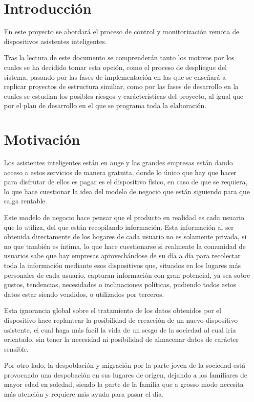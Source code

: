 \section{Introducción}

En este proyecto se abordará el proceso de control y monitorización remota de dispositivos asistentes inteligentes.

Tras la lectura de este documento se comprenderán tanto los motivos por los cuales se ha decidido tomar esta opción, como el proceso de despliegue del sistema, pasando por las fases de implementación en las que se enseñará a replicar proyectos de estructura similiar, como por las fases de desarrollo en la cuales se estudian los posibles riesgos y carácterísticas del proyecto, al igual que por el plan de desarrollo en el que se programa toda la elaboración.

\section{Motivación}

Los asistentes inteligentes están en auge y las grandes empresas están dando acceso a estos servicios de manera gratuita, donde lo único que hay que hacer para disfrutar de ellos es pagar es el dispositivo físico, en caso de que se requiera, lo que hace cuestionar la idea del modelo de negocio que están siguiendo para que salga rentable.

Este modelo de negocio hace pensar que el producto en realidad es cada usuario que lo utiliza, del que están recopilando información. Esta información al ser obtenida directamente de los hogares de cada usuario no es solamente privada, si no que también es íntima, lo que hace cuestionarse si realmente la comunidad de usuarios sabe que hay empresas aprovechándose de su día a día para recolectar toda la información mediante esos dispositivos que, situados en los lugares más personales de cada usuario, capturan información con gran potencial, ya sea sobre gustos, tendencias, necesidades o inclinaciones políticas, pudiendo todos estos datos estar siendo vendidos, o utilizados por terceros.

Esta ignorancia global sobre el tratamiento de los datos obtenidos por el dispositivo hace replantear la posibilidad de creacción de un nuevo dispositivo asistente, el cual haga más facil la vida de un sesgo de la sociedad al cual iría orientado, sin tener la necesidad ni posibilidad de almacenar datos de carácter sensible.

Por otro lado, la despoblación y migración por la parte joven de la sociedad está provocando una despobación en sus lugares de origen, dejando a los familiares de mayor edad en soledad, siendo la parte de la familia que a grosso modo necesita más atención y requiere más ayuda para pasar el día.

